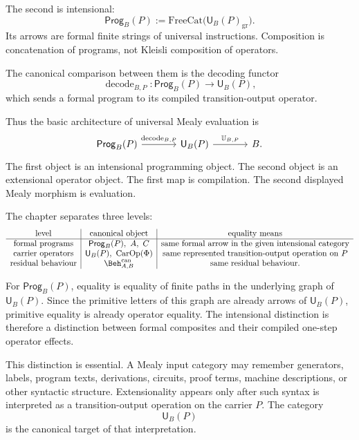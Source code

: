 The second is intensional:
\[
        \mathsf{Prog}_B(P)
        :=
        \mathrm{FreeCat}\bigl(\mathsf U_B(P)_{\mathrm{gr}}\bigr).
\]
Its arrows are formal finite strings of universal instructions.  Composition is concatenation of
programs, not Kleisli composition of operators.

The canonical comparison between them is the decoding functor
\[
        \operatorname{decode}_{B,P}:
        \mathsf{Prog}_B(P)\longrightarrow \mathsf U_B(P),
\]
which sends a formal program to its compiled transition-output operator.

Thus the basic architecture of universal Mealy evaluation is
\[
\begin{tikzcd}[column sep=large,row sep=large]
\mathsf{Prog}_B(P)
\ar[r,"\operatorname{decode}_{B,P}"]
&
\mathsf U_B(P)
\ar[r,"\mathbb U_{B,P}"]
&
B .
\end{tikzcd}
\]
The first object is an intensional programming object.  The second object is an extensional
operator object.  The first map is compilation.  The second displayed Mealy morphism is evaluation.

The chapter separates three levels:
\[
\begin{array}{c|c|c}
\text{level} & \text{canonical object} & \text{equality means} \\ \hline
\text{formal programs}
    & \mathsf{Prog}_B(P),\ A,\ C
    & \text{same formal arrow in the given intensional category} \\
\text{carrier operators}
    & \mathsf U_B(P),\ \operatorname{CarOp}(\Phi)
    & \text{same represented transition-output operation on }P \\
\text{residual behaviour}
    & \Beh^{\operatorname{can}}_{A,B}
    & \text{same residual behaviour.}
\end{array}
\]

For \(\mathsf{Prog}_B(P)\), equality is equality of finite paths in the underlying graph of
\(\mathsf U_B(P)\).  Since the primitive letters of this graph are already arrows of
\(\mathsf U_B(P)\), primitive equality is already operator equality.  The intensional distinction
is therefore a distinction between formal composites and their compiled one-step operator effects.

This distinction is essential.  A Mealy input category may remember generators, labels, program
texts, derivations, circuits, proof terms, machine descriptions, or other syntactic structure.
Extensionality appears only after such syntax is interpreted as a transition-output operation on
the carrier \(P\).  The category
\[
        \mathsf U_B(P)
\]
is the canonical target of that interpretation.

